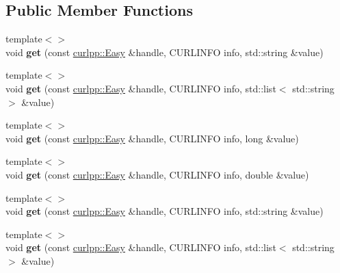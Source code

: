 \subsection*{Public Member Functions}
\begin{DoxyCompactItemize}
\item 
\hypertarget{structcurlpp_1_1InfoTypeConverter_a1f6560bcd161ce56fae548bddc0fc0fa}{{\footnotesize template$<$$>$ }\\void {\bfseries get} (const \hyperlink{classcurlpp_1_1Easy}{curlpp\-::\-Easy} \&handle, C\-U\-R\-L\-I\-N\-F\-O info, std\-::string \&value)}\label{structcurlpp_1_1InfoTypeConverter_a1f6560bcd161ce56fae548bddc0fc0fa}

\item 
\hypertarget{structcurlpp_1_1InfoTypeConverter_ad39a8717cf136a1744fcb074462454f4}{{\footnotesize template$<$$>$ }\\void {\bfseries get} (const \hyperlink{classcurlpp_1_1Easy}{curlpp\-::\-Easy} \&handle, C\-U\-R\-L\-I\-N\-F\-O info, std\-::list$<$ std\-::string $>$ \&value)}\label{structcurlpp_1_1InfoTypeConverter_ad39a8717cf136a1744fcb074462454f4}

\item 
\hypertarget{structcurlpp_1_1InfoTypeConverter_a48e3a20c163ac20a147a1ada5a48fffc}{{\footnotesize template$<$$>$ }\\void {\bfseries get} (const \hyperlink{classcurlpp_1_1Easy}{curlpp\-::\-Easy} \&handle, C\-U\-R\-L\-I\-N\-F\-O info, long \&value)}\label{structcurlpp_1_1InfoTypeConverter_a48e3a20c163ac20a147a1ada5a48fffc}

\item 
\hypertarget{structcurlpp_1_1InfoTypeConverter_a899b6e658a62c02f9c808f3852c49c81}{{\footnotesize template$<$$>$ }\\void {\bfseries get} (const \hyperlink{classcurlpp_1_1Easy}{curlpp\-::\-Easy} \&handle, C\-U\-R\-L\-I\-N\-F\-O info, double \&value)}\label{structcurlpp_1_1InfoTypeConverter_a899b6e658a62c02f9c808f3852c49c81}

\item 
\hypertarget{structcurlpp_1_1InfoTypeConverter_a1f6560bcd161ce56fae548bddc0fc0fa}{{\footnotesize template$<$$>$ }\\void {\bfseries get} (const \hyperlink{classcurlpp_1_1Easy}{curlpp\-::\-Easy} \&handle, C\-U\-R\-L\-I\-N\-F\-O info, std\-::string \&value)}\label{structcurlpp_1_1InfoTypeConverter_a1f6560bcd161ce56fae548bddc0fc0fa}

\item 
\hypertarget{structcurlpp_1_1InfoTypeConverter_ad39a8717cf136a1744fcb074462454f4}{{\footnotesize template$<$$>$ }\\void {\bfseries get} (const \hyperlink{classcurlpp_1_1Easy}{curlpp\-::\-Easy} \&handle, C\-U\-R\-L\-I\-N\-F\-O info, std\-::list$<$ std\-::string $>$ \&value)}\label{structcurlpp_1_1InfoTypeConverter_ad39a8717cf136a1744fcb074462454f4}


\end{DoxyCompactItemize}
